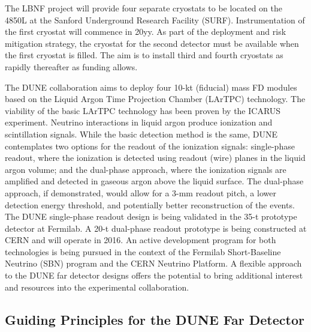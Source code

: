 The LBNF project will provide four separate cryostats to be located on the 4850L at the 
Sanford Underground Research Facility (SURF).  Instrumentation of the first cryostat 
will commence in 20yy. %
As part of the deployment and risk mitigation strategy, 
the cryostat for the second detector must be available when the first cryostat 
is filled. The aim is to install third and fourth cryostats as rapidly thereafter as funding 
allows.

The DUNE collaboration aims to deploy four 10-kt (fiducial) mass FD modules based 
on the Liquid Argon Time Projection Chamber (LArTPC) technology. The viability 
of the basic LArTPC technology has been proven by the ICARUS experiment. Neutrino 
interactions in liquid argon produce ionization and scintillation signals. While 
the basic detection method is the same, DUNE contemplates two options for the readout 
of the ionization signals: single-phase readout, where the ionization is detected 
using readout (wire) planes in the liquid argon volume; and the dual-phase approach, where 
the ionization signals are amplified and detected in gaseous argon above the liquid 
surface. The dual-phase approach, if demonstrated, would allow for a 3-mm readout 
pitch, a lower detection energy threshold, and potentially better reconstruction of 
the events. The DUNE single-phase readout design is being validated 
in the 35-t prototype detector at Fermilab. A 20-t dual-phase readout prototype is being 
constructed at CERN and will operate in 2016. An active development program for 
both technologies is being pursued in the context of the Fermilab Short-Baseline Neutrino (SBN)
program and 
the CERN Neutrino Platform. 
A flexible 
approach to the DUNE far detector designs offers the potential to bring additional 
interest and resources into the experimental collaboration. 

\subsection{Guiding Principles for the DUNE Far Detector}

